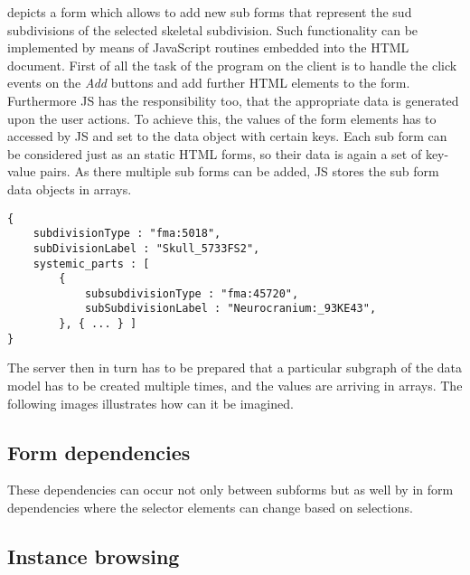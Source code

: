 

 depicts a form which allows to add new sub forms that represent the sud subdivisions of the selected skeletal subdivision. Such functionality can be implemented by means of JavaScript routines embedded into the HTML document. First of all the task of the program on the client is to handle the click events on the \textit{Add} buttons and add further HTML elements to the form. Furthermore JS has the responsibility too, that the appropriate data is generated upon the user actions. To achieve this, the values of the form elements has to accessed by JS and set to the data object with certain keys. Each sub form can be considered just as an static HTML forms, so their data is again a set of key-value pairs. As there multiple sub forms can be added, JS stores the sub form data objects in arrays.

\begin{lstlisting}[captionpos=b, caption=JSON object generated by the form, label=332L1,
basicstyle=\footnotesize,frame=single]
{
	subdivisionType : "fma:5018",
	subDivisionLabel : "Skull_5733FS2",
	systemic_parts : [
		{
			subsubdivisionType : "fma:45720",
			subSubdivisionLabel : "Neurocranium:_93KE43",
		}, { ... } ]
}
\end{lstlisting}



The server then in turn has to be prepared that a particular subgraph of the data model has to be created multiple times, and the values are arriving in arrays. The following images illustrates how can it be imagined.






\subsection{Form dependencies} \label{formDependencies}



These dependencies can occur not only between subforms but as well by in form dependencies where the selector elements can change based on selections.

\subsection{Instance browsing}



